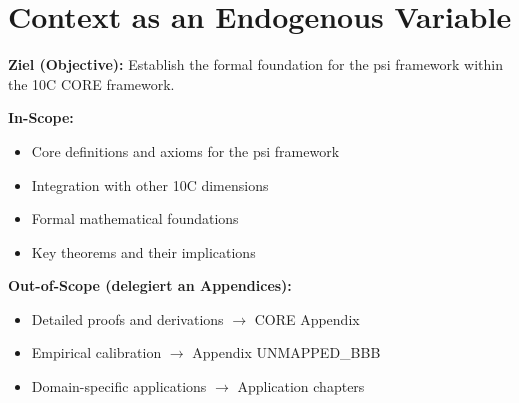 %
%
%
%

\chapter{Context as an Endogenous Variable}
\label{ch:context}

\begin{tcolorbox}[
    colback=purple!5!white,
    colframe=purple!75!black,
    title={\textbf{Chapter Scope: Ziel / In-Scope / Out-of-Scope}},
    fonttitle=\bfseries
]

\textbf{Ziel (Objective):}
Establish the formal foundation for the psi framework within the 10C CORE framework.

\vspace{0.3cm}
\textbf{In-Scope:}
\begin{itemize}[nosep]
    \item Core definitions and axioms for the psi framework
    \item Integration with other 10C dimensions
    \item Formal mathematical foundations
    \item Key theorems and their implications
\end{itemize}

\vspace{0.3cm}
\textbf{Out-of-Scope (delegiert an Appendices):}
\begin{itemize}[nosep]
    \item Detailed proofs and derivations $\rightarrow$ CORE Appendix
    \item Empirical calibration $\rightarrow$ Appendix UNMAPPED_BBB
    \item Domain-specific applications $\rightarrow$ Application chapters
\end{itemize}

\end{tcolorbox}



